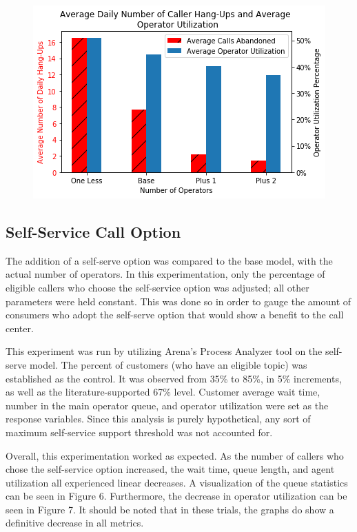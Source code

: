 \documentclass[12pt,twocolumn]{article}
\begin{document}
	\begin{figure}[h]
		\includegraphics[scale=.5]{num_ops_plot.png}
		\caption{}
	\end{figure}
	
	
	\subsection{Self-Service Call Option}

	The addition of a self-serve option was compared to the base model, with the actual number of operators.  In this experimentation, only the percentage of eligible callers who choose the self-service option was adjusted; all other parameters were held constant.  This was done so in order to gauge the amount of consumers who adopt the self-serve option that would show a benefit to the call center.
	
	\par
	
	This experiment was run by utilizing Arena's Process Analyzer tool on the self-serve model.  The percent of customers (who have an eligible topic) was established as the control.  It was observed from 35\% to 85\%, in 5\% increments, as well as the literature-supported 67\% level.  Customer average wait time, number in the main operator queue, and operator utilization were set as the response variables.  Since this analysis is purely hypothetical, any sort of maximum self-service support threshold was not accounted for.
	
	\par
	
	Overall, this experimentation worked as expected.  As the number of callers who chose the self-service option increased, the wait time, queue length, and agent utilization all experienced linear decreases.  A visualization of the queue statistics can be seen in Figure 6.  Furthermore, the decrease in operator utilization can be seen in Figure 7.  It should be noted that in these trials, the graphs do show a definitive decrease in all metrics.
	
\end{document}

